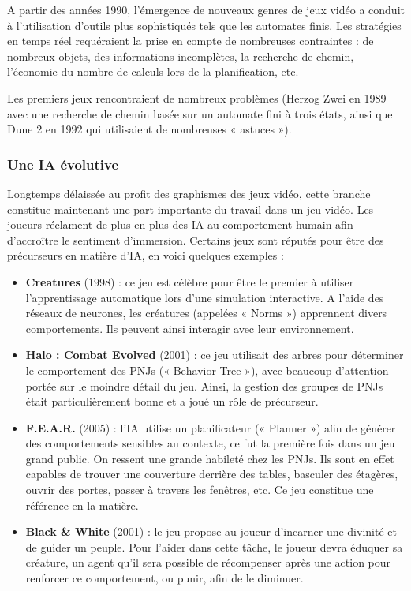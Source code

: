 \documentclass[a4paper, 12pt]{article} %
\begin{document}
A partir des années 1990, l’émergence de nouveaux genres de jeux vidéo a conduit à l’utilisation d’outils plus sophistiqués tels que les automates finis. Les stratégies en temps réel requéraient la prise en compte de nombreuses contraintes : de nombreux objets, des informations incomplètes, la recherche de chemin, l’économie du nombre de calculs lors de la planification, etc. 

Les premiers jeux rencontraient de nombreux problèmes (Herzog Zwei en 1989 avec une recherche de chemin basée sur un automate fini à trois états, ainsi que Dune 2 en 1992 qui utilisaient de nombreuses « astuces »). 

\newpage
\subsubsection{Une IA évolutive}

Longtemps délaissée au profit des graphismes des jeux vidéo, cette branche constitue maintenant une part importante du travail dans un jeu vidéo. Les joueurs réclament de plus en plus des IA au comportement humain afin d'accroître le sentiment d’immersion. Certains jeux sont réputés pour être des précurseurs en matière d’IA, en voici quelques exemples : 

\begin{itemize}
	\item \textbf{Creatures} (1998) : ce jeu est célèbre pour être le premier à utiliser l’apprentissage automatique lors d’une simulation interactive. A l’aide des réseaux de neurones, les créatures (appelées « Norms ») apprennent divers comportements. Ils peuvent ainsi interagir avec leur environnement. 

	\item \textbf{Halo : Combat Evolved} (2001) : ce jeu utilisait des arbres pour déterminer le comportement des PNJs (« Behavior Tree »), avec beaucoup d’attention portée sur le moindre détail du jeu. Ainsi, la gestion des groupes de PNJs était particulièrement bonne et a joué un rôle de précurseur. 

	\item \textbf{F.E.A.R.} (2005) : l’IA utilise un planificateur (« Planner ») afin de générer des comportements sensibles au contexte, ce fut la première fois dans un jeu grand public. On ressent une grande habileté chez les PNJs. Ils sont en effet capables de trouver une couverture derrière des tables, basculer des étagères, ouvrir des portes, passer à travers les fenêtres, etc. Ce jeu constitue une référence en la matière.  

	\item \textbf{Black \& White} (2001) : le jeu propose au joueur d’incarner une divinité et de guider un peuple. Pour l’aider dans cette tâche, le joueur devra éduquer sa créature, un agent qu’il sera possible de récompenser après une action pour renforcer ce comportement, ou punir, afin de le diminuer. 
\end{itemize}
\end{document}
